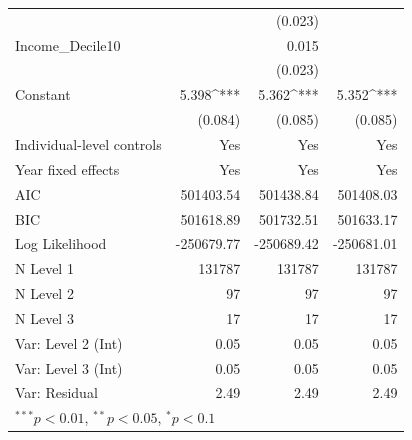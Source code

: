 \documentclass[utf8]{frontiersSCNS} %
\begin{document}
\begin{table}[h]
\begin{tabular}{l D{.}{.}{7.5} D{.}{.}{7.5} D{.}{.}{7.5}}
                             &             & (0.023)      &             \\
Income\_Decile10             &             &  0.015       &             \\
                             &             & (0.023)      &             \\
\hline
Constant                     &  5.398^{***} & 5.362^{***}  & 5.352^{***}  \\
                             & (0.084)      & (0.085)      & (0.085)      \\
\hline
Individual-level controls    &     Yes     &     Yes     &     Yes     \\
Year fixed effects           &     Yes     &     Yes     &     Yes     \\
\hline
AIC                          & 501403.54   &  501438.84  & 501408.03   \\
BIC                          & 501618.89   &  501732.51  & 501633.17   \\
Log Likelihood               & -250679.77  & -250689.42  & -250681.01  \\
N Level 1                    & 131787      & 131787      & 131787      \\
N Level 2                    & 97          & 97          & 97          \\
N Level 3                    & 17          & 17          & 17          \\
Var: Level 2 (Int)           & 0.05        & 0.05        & 0.05        \\
Var: Level 3 (Int)           & 0.05        & 0.05        & 0.05        \\
Var: Residual                & 2.49        & 2.49        & 2.49        \\
\bottomrule
{}
\end{tabular}
\end{table}
\end{document}
